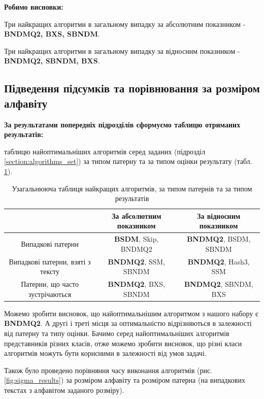 \documentclass[a4paper,14pt]{extarticle} %
\begin{document}
				\textbf{Робимо висновки:}

				Три найкращих алгоритми в загальному випадку за абсолютним показником - \textbf{BNDMQ2, BXS, SBNDM}.

				Три найкращих алгоритми в загальному випадку за відносним показником - \textbf{BNDMQ2, SBNDM, BXS}.
					
			\subsection{Підведення підсумків та порівнювання за розміром алфавіту}

			\textbf{За результатами попередніх підрозділів сформуємо таблицю отриманих результатів:}
			
			таблицю найоптимальніших алгоритмів серед заданих (підрозділ \ref{section:algorithms_set}) за типом патерну та за типом оцінки результату (табл. \ref{table:all}).

			\begin{table}[H]
				\centering
				\footnotesize
				\begin{tabular}{|c|c|c|}
				\hline 
				& За абсолютним показником & За відносним показником \\
				\hline 
				Випадкові патерни  & \textbf{BSDM}, Skip, BNDMQ2 & \textbf{BNDMQ2}, BSDM, SBNDM \\
				\hline
				Випадкові патерни, взяті з тексту & \textbf{BNDMQ2}, SSM, SBNDM & \textbf{BNDMQ2}, Hash3, SSM \\
				\hline
				Патерни, що часто зустрічаються & \textbf{BNDMQ2}, BXS, SBNDM & \textbf{BNDMQ2}, SBNDM, BXS \\
				\hline
				\end{tabular}
				\caption{Узагальнююча таблиця найкращих алгоритмів, за типом патернів та за типом результатів}
				\label {table:all}
			\end{table}

			Можемо зробити висновок, що найоптимальнішим алгоритмом з нашого набору є \textbf{BNDMQ2}. А другі і треті місця за оптимальністю відрізняються в залежності від патерну та типу оцінки. Бачимо серед найоптимальніших алгоритмів представників різних класів, отже можемо зробити висновок, що різні класи алгоритмів можуть бути корисними в залежності від умов задачі.
			
			Також було проведено порівняння часу виконання алгоритмів (рис. \ref{fig:sigma_results}) за розміром алфавіту та розміром патерна (на випадкових текстах з алфавітом заданого розміру).
\end{document}

